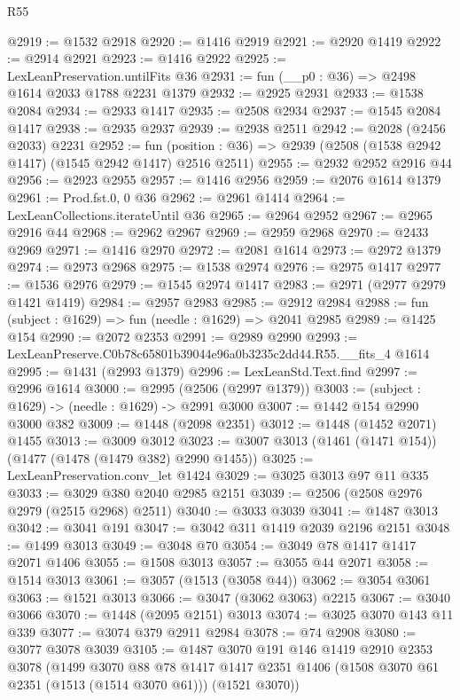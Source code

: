 \begin{lexlean}{R55}
\begin{coremodule}
{{@2919 := @1532 @2918
@2920 := @1416 @2919
@2921 := @2920 @1419
@2922 := @2914 @2921
@2923 := @1416 @2922
@2925 := LexLeanPreservation.untilFits @36
@2931 := fun (__p0 : @36) => @2498 @1614 @2033 @1788 @2231 @1379
@2932 := @2925 @2931
@2933 := @1538 @2084
@2934 := @2933 @1417
@2935 := @2508 @2934
@2937 := @1545 @2084 @1417
@2938 := @2935 @2937
@2939 := @2938 @2511
@2942 := @2028 (@2456 @2033) @2231
@2952 := fun (position : @36) => @2939 (@2508 (@1538 @2942 @1417) (@1545 @2942 @1417) @2516 @2511)
@2955 := @2932 @2952 @2916 @44
@2956 := @2923 @2955
@2957 := @1416 @2956
@2959 := @2076 @1614 @1379
@2961 := Prod.fst.{0, 0} @36
@2962 := @2961 @1414
@2964 := LexLeanCollections.iterateUntil @36
@2965 := @2964 @2952
@2967 := @2965 @2916 @44
@2968 := @2962 @2967
@2969 := @2959 @2968
@2970 := @2433 @2969
@2971 := @1416 @2970
@2972 := @2081 @1614
@2973 := @2972 @1379
@2974 := @2973 @2968
@2975 := @1538 @2974
@2976 := @2975 @1417
@2977 := @1536 @2976
@2979 := @1545 @2974 @1417
@2983 := @2971 (@2977 @2979 @1421 @1419)
@2984 := @2957 @2983
@2985 := @2912 @2984
@2988 := fun (subject : @1629) => fun (needle : @1629) => @2041 @2985
@2989 := @1425 @154
@2990 := @2072 @2353
@2991 := @2989 @2990
@2993 := LexLeanPreserve.C0b78c65801b39044e96a0b3235c2dd44.R55.__fits_4 @1614
@2995 := @1431 (@2993 @1379)
@2996 := LexLeanStd.Text.find
@2997 := @2996 @1614
@3000 := @2995 (@2506 (@2997 @1379))
@3003 := (subject : @1629) -> (needle : @1629) -> @2991 @3000
@3007 := @1442 @154 @2990 @3000 @382
@3009 := @1448 (@2098 @2351)
@3012 := @1448 (@1452 @2071) @1455
@3013 := @3009 @3012
@3023 := @3007 @3013 (@1461 (@1471 @154)) (@1477 (@1478 (@1479 @382) @2990 @1455))
@3025 := LexLeanPreservation.conv_let @1424
@3029 := @3025 @3013 @97 @11 @335
@3033 := @3029 @380 @2040 @2985 @2151
@3039 := @2506 (@2508 @2976 @2979 (@2515 @2968) @2511)
@3040 := @3033 @3039
@3041 := @1487 @3013
@3042 := @3041 @191
@3047 := @3042 @311 @1419 @2039 @2196 @2151
@3048 := @1499 @3013
@3049 := @3048 @70
@3054 := @3049 @78 @1417 @1417 @2071 @1406
@3055 := @1508 @3013
@3057 := @3055 @44 @2071
@3058 := @1514 @3013
@3061 := @3057 (@1513 (@3058 @44))
@3062 := @3054 @3061
@3063 := @1521 @3013
@3066 := @3047 (@3062 @3063) @2215
@3067 := @3040 @3066
@3070 := @1448 (@2095 @2151) @3013
@3074 := @3025 @3070 @143 @11 @339
@3077 := @3074 @379 @2911 @2984
@3078 := @74 @2908
@3080 := @3077 @3078 @3039
@3105 := @1487
    @3070
    @191
    @146
    @1419
    @2910
    @2353
    @3078
    (@1499
      @3070
      @88
      @78
      @1417
      @1417
      @2351
      @1406
      (@1508 @3070 @61 @2351 (@1513 (@1514 @3070 @61)))
      (@1521 @3070))
}}
\end{coremodule}
\end{lexlean}
